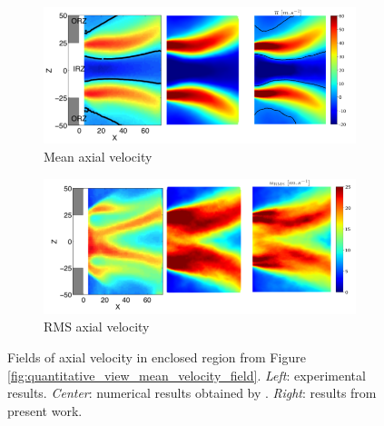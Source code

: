 \begin{figure}
\centering
\begin{subfigure}[b]{1.0\textwidth}
	\centering
   \includegraphics[scale=1.0]{./part3_applications/figures_aero/validation_qualitative_u_mean}
   \caption{Mean axial velocity}
   \label{fig:validation_qualitative_u_mean} 
\end{subfigure}
\begin{subfigure}[b]{1.0\textwidth}
	\centering
   \includegraphics[scale=1.0]{./part3_applications/figures_aero/validation_qualitative_u_rms}
   \caption{RMS axial velocity}
   \label{fig:validation_qualitative_u_rms}
\end{subfigure}
\caption{Fields of axial velocity in enclosed region from Figure \ref{fig:quantitative_view_mean_velocity_field}. \textsl{Left}: experimental results. \textsl{Center}: numerical results obtained by . \textsl{Right}: results from present work.}
\label{fig:validation_qualitative_u}
\end{figure}

